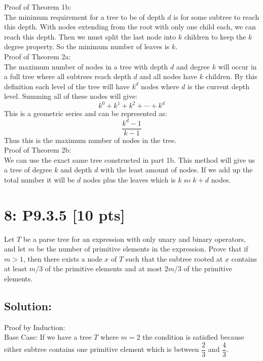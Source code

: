 \documentclass[12pt]{article}
\begin{document}
\noindent
Proof of Theorem 1b:\\
The minimum requirement for a tree to be of depth $d$ is for some subtree to reach this depth. With nodes extending from the root with only one child each, we can reach this depth. Then we must split the last node into $k$ children to keep the $k$ degree property. So the minimum number of leaves is $k$.\\

\noindent
Proof of Theorem 2a: \\

The maximum number of nodes in a tree with depth $d$ and degree $k$ will occur in a full tree where all subtrees reach depth $d$ and all nodes have $k$ children. By this definition each level of the tree will have $k^d$ nodes where $d$ is the current depth level. Summing all of these nodes will give:
\[ k^0 + k^1 + k^2 + \cdots + k^d \]
This is a geometric series and can be represented as:
\[ \dfrac{k^{d}-1}{k-1} \]
Thus this is the maximum number of nodes in the tree.\\

\noindent
Proof of Theorem 2b:\\
We can use the exact same tree constructed in part 1b. This method will give us a tree of degree $k$ and depth $d$ with the least amount of nodes. If we add up the total number it will be $d$ nodes plus the leaves which is $k$ so $k+d$ nodes.


\newpage
\section*{\textbf{8: P9.3.5} [10 pts]}
Let $T$ be a parse tree for an expression with only unary and binary operators, and let $m$ be the number of primitive elements in the expression. Prove that if $m > 1$, then there exists a node $x$ of $T$ such that the subtree rooted at $x$ contains at least $m/3$ of the primitive elements and at most $2m/3$ of the primitive elements.


\subsection*{\textbf{Solution:}}
Proof by Induction:\\

Base Case: If we have a tree $T$ where $m=2$ the condition is satisfied because either subtree contains one primitive element which is between $\dfrac{2}{3}$ and $\dfrac{4}{3}$.\\
\end{document}
